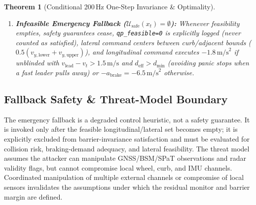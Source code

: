 \documentclass[journal]{IEEEtran}
\newtheorem{theorem}{Theorem}
\begin{document}
\begin{theorem}[Conditional 200\,Hz One-Step Invariance \& Optimality]
\begin{enumerate}
    \item \textbf{Infeasible Emergency Fallback ($\mathcal{U}_{\text{safe}}(x_t) = \emptyset$):} Whenever feasibility empties, safety guarantees cease, \texttt{qp\_feasible=0} is explicitly logged (never counted as satisfied), lateral command centers between curb/adjacent bounds ($0.5(v_{y,\text{lower}}+v_{y,\text{upper}})$), and longitudinal command executes $-1.8\,\text{m/s}^2$ if unblinded with $v_{\text{lead}}-v_t > 1.5\,\text{m/s}$ and $d_{\text{eff}} > d_{\min}$ (avoiding panic stops when a fast leader pulls away) or $-a_{\text{brake}}=-6.5\,\text{m/s}^2$ otherwise.
\end{enumerate}
\end{theorem}

\subsection{Fallback Safety \& Threat-Model Boundary}
The emergency fallback is a degraded control heuristic, not a safety guarantee. It is invoked only after the feasible longitudinal/lateral set becomes empty; it is explicitly excluded from barrier-invariance satisfaction and must be evaluated for collision risk, braking-demand adequacy, and lateral feasibility. The threat model assumes the attacker can manipulate GNSS/BSM/SPaT observations and radar validity flags, but cannot compromise local wheel, curb, and IMU channels. Coordinated manipulation of multiple external channels or compromise of local sensors invalidates the assumptions under which the residual monitor and barrier margin are defined.
\end{document}
